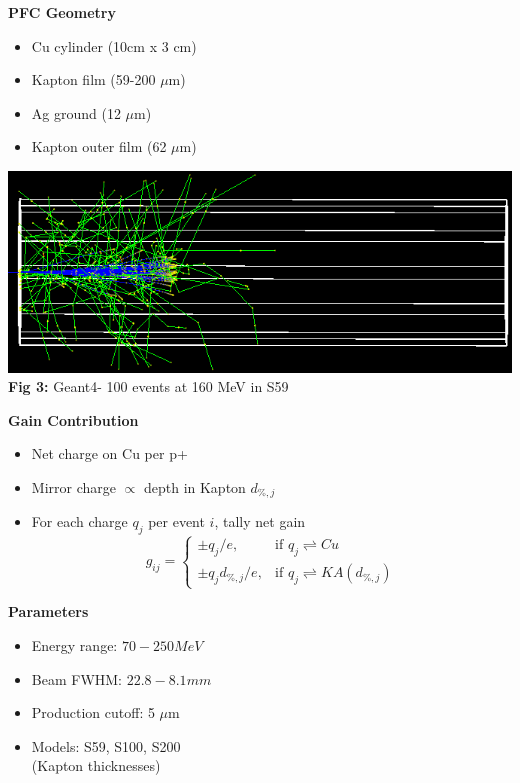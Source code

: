 \documentclass[landscape,archE1,fontscale=0.285]{baposter} %
\newcommand{\compresslist}{%
\setlength{\itemsep}{1pt}
\setlength{\parskip}{0pt}
\setlength{\parsep}{0pt}
}
\begin{document}
\begin{poster}
{{\fontsize{15}{18}\selectfont \textbf{PFC Geometry}}
\begin{itemize}[leftmargin=*]\compresslist
\item {\fontsize{15}{18}\selectfont Cu cylinder (10cm x 3 cm)}
\item {\fontsize{15}{18}\selectfont Kapton film (59-200 $\mu$m)}
\item {\fontsize{15}{18}\selectfont Ag ground (12 $\mu$m)}
\item {\fontsize{15}{18}\selectfont Kapton outer film (62 $\mu$m)}
\end{itemize}
\begin{center}
\includegraphics[width=0.9\linewidth]{figures/G4_dist.png}
\\{\fontsize{14.5}{16}\selectfont \textbf{Fig 3:} Geant4- 100 events at 160 MeV in S59}
\end{center}
\vspace{1em}
{\fontsize{15}{18}\selectfont \textbf{Gain Contribution}}
\begin{itemize}[leftmargin=*]\compresslist
\item {\fontsize{15}{18}\selectfont Net charge on Cu per p+}
\item {\fontsize{15}{18}\selectfont Mirror charge $\propto$ depth in Kapton $d_{\%,j}$}
\item {\fontsize{15}{18}\selectfont For each charge $q_j$ per event $i$, tally net gain}
  $$ g_{ij} = \left\{\begin{array}{ll}
                  \pm q_j/e, & \text{if } q_j \rightleftharpoons Cu \\
                  \pm q_jd_{\%,j}/e, & \text{if } q_j \rightleftharpoons KA(d_{\%,j})
                  \end{array}\right.$$
\end{itemize}
\vspace{1em}
{\fontsize{15}{18}\selectfont \textbf{Parameters}}
\begin{itemize}[leftmargin=*]\compresslist
\item {\fontsize{15}{18}\selectfont Energy range: $70 - 250 MeV$}
\item {\fontsize{15}{19}\selectfont Beam FWHM: $22.8 - 8.1 mm$}
\item {\fontsize{15}{18}\selectfont Production cutoff: 5 $\mu$m}
\item {\fontsize{15}{18}\selectfont Models: S59, S100, S200\\(Kapton thicknesses)}
\end{itemize}
}


\end{poster}
\end{document}
